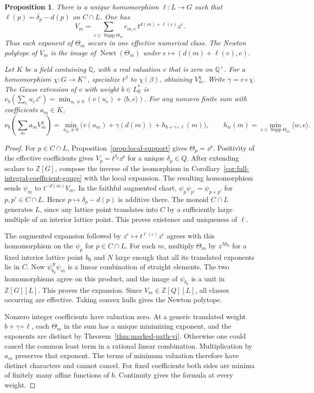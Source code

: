 \documentclass[11pt,reqno]{amsart}
\numberwithin{equation}{section}
\newtheorem{proposition}[theorem]{Proposition}
\theoremstyle{definition}
\theoremstyle{remark}
\DeclareMathOperator{\Newt}{Newt}
\DeclareMathOperator{\Supp}{Supp}
\begin{document}
\begin{proposition}\label{prop:curve-character-gauss}
There is a unique homomorphism \(\ell:L\to G\) such that
\(\ell(p)=\delta_p-d(p)\) on \(C\cap L\). One has
\[ V_m=\sum_{e\in\Supp\Theta_m} c_{m,e}\,t^{d(m)+\ell(e)}z^e . \]
Thus each exponent of \(\Theta_m\) occurs in one effective numerical
class. The Newton polytope of \(V_m\) is the image of
\(\Newt(\Theta_m)\) under \(e\mapsto(d(m)+\ell(e),e)\).

Let \(K\) be a field containing \(\mathbb Q\), with a real valuation
\(v\) that is zero on \(\mathbb Q^\times\).
For a homomorphism \(\chi:G\to K^\times\), specialize \(t^\beta\)
to \(\chi(\beta)\), obtaining \(V_m^\chi\). Write
\(\gamma=v\circ\chi\). The Gauss extension of \(v\) with weight
\(b\in L^*_{\mathbb R}\) is
\(\nu_b(\sum_e u_e z^e)=\min_{u_e\ne0}(v(u_e)+\langle b,e\rangle)\).
For any nonzero finite
sum with coefficients \(a_m\in K\),
\[ \nu_b\!\left(\sum_m a_mV_m^\chi\right)= \min_{a_m\ne0}\bigl(v(a_m)+\gamma(d(m))+h_{b+\gamma\circ\ell}(m)\bigr), \qquad h_w(m)=\min_{e\in\Supp\Theta_m}\langle w,e\rangle . \]
\end{proposition}
\begin{proof}
For \(p\in C\cap L\), Proposition~\ref{prop:local-support} gives
\(\Theta_p=z^p\). Positivity of the effective coefficients gives
\(V_p=t^{\delta_p}z^p\) for a unique \(\delta_p\in Q\).
After extending scalars to \(\mathbb Z[G]\), compose the inverse
of the isomorphism in Corollary~\ref{cor:full-integral-coefficient-gauge}
with the local expansion. The resulting homomorphism sends
\(\psi_m\) to \(t^{-d(m)}V_m\). In the faithful augmented chart,
\(\psi_p\psi_{p'}=\psi_{p+p'}\) for \(p,p'\in C\cap L\). Hence
\(p\mapsto\delta_p-d(p)\) is additive there. The monoid \(C\cap L\)
generates \(L\), since any lattice point translates into \(C\) by
a sufficiently large multiple of an interior lattice point. This
proves existence and uniqueness of \(\ell\).

The augmented expansion followed by \(z^e\mapsto t^{\ell(e)}z^e\)
agrees with this homomorphism on the \(\psi_p\) for \(p\in C\cap L\).
For each \(m\), multiply \(\Theta_m\) by \(z^{Nb_0}\) for a fixed
interior lattice point \(b_0\) and \(N\) large enough that all its
translated exponents lie in \(C\). Now \(\psi_{b_0}^N\psi_m\)
is a linear combination of straight elements. The two homomorphisms
agree on this product, and the image of \(\psi_{b_0}\) is a unit
in \(\mathbb Z[G][L]\). This proves the expansion. Since
\(V_m\in\mathbb Z[Q][L]\), all classes occurring are effective.
Taking convex hulls gives the Newton polytope.

Nonzero integer coefficients have valuation zero. At a generic
translated weight \(b+\gamma\circ\ell\), each \(\Theta_m\) in the
sum has a unique minimizing exponent, and the exponents are distinct
by Theorem~\ref{thm:marked-path-vi}. Otherwise one could cancel the
common least term in a rational linear combination. Multiplication
by \(a_m\) preserves that exponent. The terms of minimum valuation therefore have distinct characters
and cannot cancel. For fixed coefficients both sides are minima of
finitely many affine functions of \(b\). Continuity gives the formula
at every weight.
\end{proof}
\end{document}
